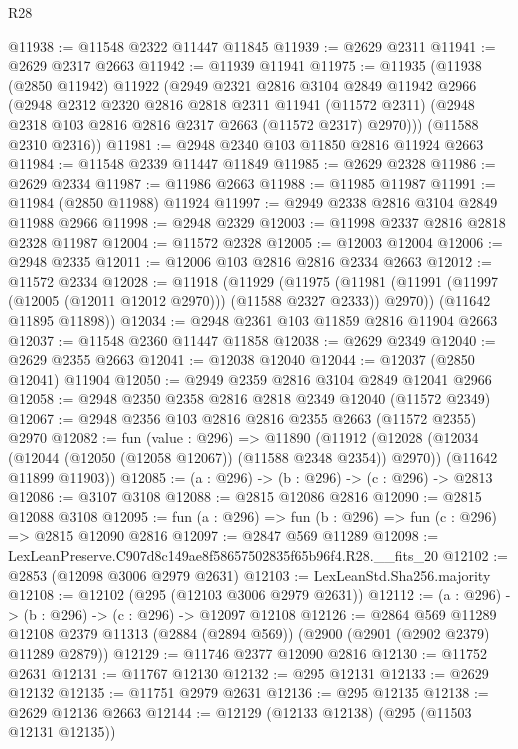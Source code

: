\begin{lexlean}{R28}
\begin{coremodule}
@11938 := @11548 @2322 @11447 @11845
@11939 := @2629 @2311
@11941 := @2629 @2317 @2663
@11942 := @11939 @11941
@11975 := @11935
    (@11938
      (@2850 @11942)
      @11922
      (@2949
        @2321
        @2816
        @3104
        @2849
        @11942
        @2966
        (@2948
          @2312
          @2320
          @2816
          @2818
          @2311
          @11941
          (@11572 @2311)
          (@2948 @2318 @103 @2816 @2816 @2317 @2663 (@11572 @2317) @2970)))
      (@11588 @2310 @2316))
@11981 := @2948 @2340 @103 @11850 @2816 @11924 @2663
@11984 := @11548 @2339 @11447 @11849
@11985 := @2629 @2328
@11986 := @2629 @2334
@11987 := @11986 @2663
@11988 := @11985 @11987
@11991 := @11984 (@2850 @11988) @11924
@11997 := @2949 @2338 @2816 @3104 @2849 @11988 @2966
@11998 := @2948 @2329
@12003 := @11998 @2337 @2816 @2818 @2328 @11987
@12004 := @11572 @2328
@12005 := @12003 @12004
@12006 := @2948 @2335
@12011 := @12006 @103 @2816 @2816 @2334 @2663
@12012 := @11572 @2334
@12028 := @11918
    (@11929
      (@11975 (@11981 (@11991 (@11997 (@12005 (@12011 @12012 @2970))) (@11588 @2327 @2333)) @2970))
      (@11642 @11895 @11898))
@12034 := @2948 @2361 @103 @11859 @2816 @11904 @2663
@12037 := @11548 @2360 @11447 @11858
@12038 := @2629 @2349
@12040 := @2629 @2355 @2663
@12041 := @12038 @12040
@12044 := @12037 (@2850 @12041) @11904
@12050 := @2949 @2359 @2816 @3104 @2849 @12041 @2966
@12058 := @2948 @2350 @2358 @2816 @2818 @2349 @12040 (@11572 @2349)
@12067 := @2948 @2356 @103 @2816 @2816 @2355 @2663 (@11572 @2355) @2970
@12082 := fun (value : @296) =>
  @11890
    (@11912
      (@12028 (@12034 (@12044 (@12050 (@12058 @12067)) (@11588 @2348 @2354)) @2970))
      (@11642 @11899 @11903))
@12085 := (a : @296) -> (b : @296) -> (c : @296) -> @2813
@12086 := @3107 @3108
@12088 := @2815 @12086 @2816
@12090 := @2815 @12088 @3108
@12095 := fun (a : @296) => fun (b : @296) => fun (c : @296) => @2815 @12090 @2816
@12097 := @2847 @569 @11289
@12098 := LexLeanPreserve.C907d8c149ae8f58657502835f65b96f4.R28.__fits_20
@12102 := @2853 (@12098 @3006 @2979 @2631)
@12103 := LexLeanStd.Sha256.majority
@12108 := @12102 (@295 (@12103 @3006 @2979 @2631))
@12112 := (a : @296) -> (b : @296) -> (c : @296) -> @12097 @12108
@12126 := @2864
    @569
    @11289
    @12108
    @2379
    @11313
    (@2884 (@2894 @569))
    (@2900 (@2901 (@2902 @2379) @11289 @2879))
@12129 := @11746 @2377 @12090 @2816
@12130 := @11752 @2631
@12131 := @11767 @12130
@12132 := @295 @12131
@12133 := @2629 @12132
@12135 := @11751 @2979 @2631
@12136 := @295 @12135
@12138 := @2629 @12136 @2663
@12144 := @12129 (@12133 @12138) (@295 (@11503 @12131 @12135))

\end{coremodule}
\end{lexlean}

